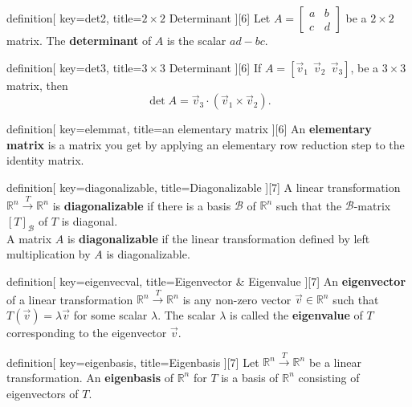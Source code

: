 \begin{SaveConcept}{definition}[
		key=det2,
		title={$2\times 2$ Determinant}
	][6]
	Let $A = \begin{bmatrix} a & b \\ c & d \end{bmatrix} $ be a $2 \times 2$ matrix. The {\bf determinant} of $A$ is the scalar $ad - bc$. 
\end{SaveConcept}


\begin{SaveConcept}{definition}[
		key=det3,
		title={$3\times 3$ Determinant}
	][6]
        If $A=[\vec v_1\:\:\vec v_2\:\:\vec v_3]$, be a $3\times 3$ matrix, then
        $$
        \det A=\vec v_3\cdot (\vec v_1\times \vec v_2). 
        $$
\end{SaveConcept}


\begin{SaveConcept}{definition}[
		key=elemmat,
		title={an elementary matrix}
	][6]
        An \textbf{elementary matrix} is a matrix you get by applying an elementary row reduction step to the identity matrix.
\end{SaveConcept}





\begin{SaveConcept}{definition}[
		key=diagonalizable,
		title={Diagonalizable}
	][7]
        A linear transformation $\mathbb R^n \overset{T}\longrightarrow \mathbb R^n$ is {\bf diagonalizable} if  there is a basis $\mathcal{B}$ of $\mathbb R^n$ such that the $\mathcal{B}$-matrix $[T]_{\mathcal{B}}$ of $T$ is diagonal.\\ A matrix $A$ is {\bf diagonalizable} if the linear transformation defined by left multiplication by $A$ is diagonalizable.
\end{SaveConcept}


\begin{SaveConcept}{definition}[
		key=eigenvecval,
		title={Eigenvector \& Eigenvalue}
	][7]
        An {\bf eigenvector} of a linear transformation  $\mathbb R^n \overset{T}\longrightarrow \mathbb R^n$ is any non-zero vector $\vec v \in \mathbb R^n$ such that $T(\vec v) = \lambda \vec v$ for some scalar $\lambda$. The scalar  $\lambda$ is called the {\bf eigenvalue} of $T$ corresponding to the eigenvector $\vec v$.
\end{SaveConcept}


\begin{SaveConcept}{definition}[
		key=eigenbasis,
		title={Eigenbasis}
	][7]
	Let $\mathbb R^n \overset{T}\longrightarrow \mathbb R^n$ be a linear transformation. An {\bf eigenbasis} of $\mathbb R^n$ for $T$ is a basis of $\mathbb R^n$ consisting of eigenvectors of $T$.
\end{SaveConcept}


